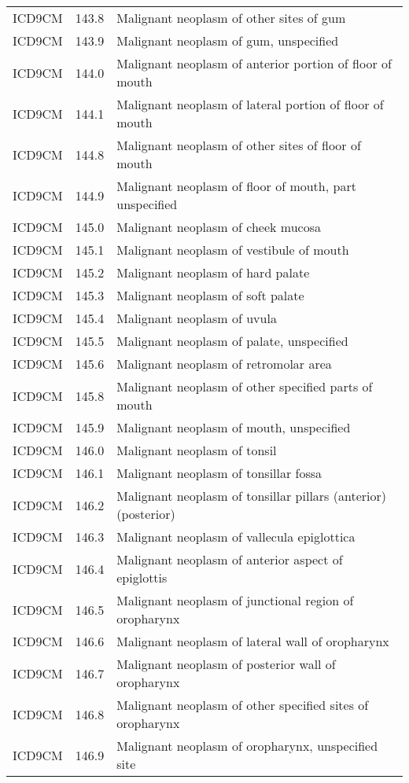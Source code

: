 \begin{longtable}{p{}p{}p{}}
  ICD9CM & 143.8 & Malignant neoplasm of other sites of gum \\ 
  ICD9CM & 143.9 & Malignant neoplasm of gum, unspecified \\ 
  ICD9CM & 144.0 & Malignant neoplasm of anterior portion of floor of mouth \\ 
  ICD9CM & 144.1 & Malignant neoplasm of lateral portion of floor of mouth \\ 
  ICD9CM & 144.8 & Malignant neoplasm of other sites of floor of mouth \\ 
  ICD9CM & 144.9 & Malignant neoplasm of floor of mouth, part unspecified \\ 
  ICD9CM & 145.0 & Malignant neoplasm of cheek mucosa \\ 
  ICD9CM & 145.1 & Malignant neoplasm of vestibule of mouth \\ 
  ICD9CM & 145.2 & Malignant neoplasm of hard palate \\ 
  ICD9CM & 145.3 & Malignant neoplasm of soft palate \\ 
  ICD9CM & 145.4 & Malignant neoplasm of uvula \\ 
  ICD9CM & 145.5 & Malignant neoplasm of palate, unspecified \\ 
  ICD9CM & 145.6 & Malignant neoplasm of retromolar area \\ 
  ICD9CM & 145.8 & Malignant neoplasm of other specified parts of mouth \\ 
  ICD9CM & 145.9 & Malignant neoplasm of mouth, unspecified \\ 
  ICD9CM & 146.0 & Malignant neoplasm of tonsil \\ 
  ICD9CM & 146.1 & Malignant neoplasm of tonsillar fossa \\ 
  ICD9CM & 146.2 & Malignant neoplasm of tonsillar pillars (anterior) (posterior) \\ 
  ICD9CM & 146.3 & Malignant neoplasm of vallecula epiglottica \\ 
  ICD9CM & 146.4 & Malignant neoplasm of anterior aspect of epiglottis \\ 
  ICD9CM & 146.5 & Malignant neoplasm of junctional region of oropharynx \\ 
  ICD9CM & 146.6 & Malignant neoplasm of lateral wall of oropharynx \\ 
  ICD9CM & 146.7 & Malignant neoplasm of posterior wall of oropharynx \\ 
  ICD9CM & 146.8 & Malignant neoplasm of other specified sites of oropharynx \\ 
  ICD9CM & 146.9 & Malignant neoplasm of oropharynx, unspecified site \\ 

\end{longtable}
